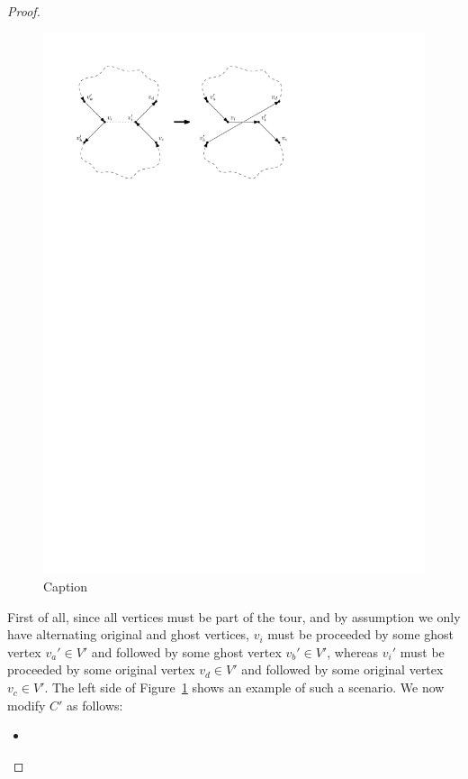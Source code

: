 \documentclass{article}
\begin{document}
\begin{proof}
\begin{itemize}
        \begin{figure}
            \centering
            \includegraphics{Assignment3/figures.pdf}
            \caption{Caption}
            \label{fig:no_ghost}
        \end{figure}

        First of all, since all vertices must be part of the tour, and by assumption we only have alternating original and ghost vertices, $v_i$ must be proceeded by some ghost vertex $v_a' \in V'$ and followed by some ghost vertex $v_b' \in V'$, whereas $v_i'$ must be proceeded by some original vertex $v_d \in V'$ and followed by some original vertex $v_c \in V'$. The left side of Figure~\ref{fig:no_ghost} shows an example of such a scenario. We now modify $C'$ as follows:
        \begin{itemize}
            \item 
        \end{itemize}

        

        
    \end{itemize}
    
   


\end{proof}
\end{document}

